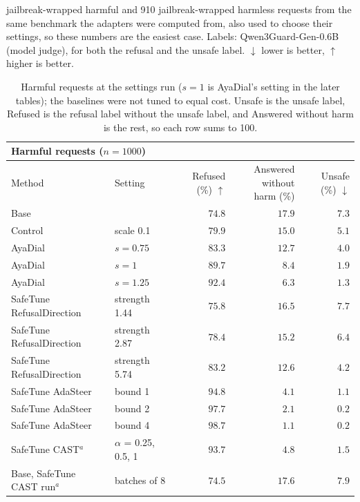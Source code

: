 \documentclass[10pt,a4paper]{article}
\renewcommand{\arraystretch}{1.12}
\begin{document}
\vspace{-3pt} jailbreak-wrapped harmful and 910 jailbreak-wrapped harmless requests from the same benchmark the adapters were computed from, also used to choose their settings, so these numbers are the easiest case. Labels: Qwen3Guard-Gen-0.6B (model judge), for both the refusal and the unsafe label. $\downarrow$ lower is better, $\uparrow$ higher is better.

\begin{table}[H]\centering\small\renewcommand{\arraystretch}{1.25}\begin{tabular}{|l|l|r|r|r|}\hline
\multicolumn{5}{|l|}{\textbf{Harmful requests ($n = 1000$)}}\\\hline
Method & Setting & Refused (\%) $\uparrow$ & \makecell[r]{Answered without\\harm (\%)} & Unsafe (\%) $\downarrow$\\\hline
Base &  & $74.8$ & $17.9$ & $7.3$\\\hline
Control & scale 0.1 & $79.9$ & $15.0$ & $5.1$\\\hline
AyaDial & $s = 0.75$ & $83.3$ & $12.7$ & $4.0$\\\hline
AyaDial & $s = 1$ & $89.7$ & $8.4$ & $1.9$\\\hline
AyaDial & $s = 1.25$ & $92.4$ & $6.3$ & $1.3$\\\hline
SafeTune RefusalDirection & strength 1.44 & $75.8$ & $16.5$ & $7.7$\\\hline
SafeTune RefusalDirection & strength 2.87 & $78.4$ & $15.2$ & $6.4$\\\hline
SafeTune RefusalDirection & strength 5.74 & $83.2$ & $12.6$ & $4.2$\\\hline
SafeTune AdaSteer & bound 1 & $94.8$ & $4.1$ & $1.1$\\\hline
SafeTune AdaSteer & bound 2 & $97.7$ & $2.1$ & $\mathbf{0.2}$\\\hline
SafeTune AdaSteer & bound 4 & $\mathbf{98.7}$ & $1.1$ & $\mathbf{0.2}$\\\hline
SafeTune CAST$^{a}$ & $\alpha$ = 0.25, 0.5, 1 & $93.7$ & $4.8$ & $1.5$\\\hline
Base, SafeTune CAST run$^{a}$ & batches of 8 & $74.5$ & $17.6$ & $7.9$\\\hline
\end{tabular}
\caption{Harmful requests at the settings run ($s = 1$ is AyaDial's setting in the later tables); the baselines were not tuned to equal cost. Unsafe is the unsafe label, Refused is the refusal label without the unsafe label, and Answered without harm is the rest, so each row sums to 100.}\label{tab:mainh}\end{table}
\end{document}
